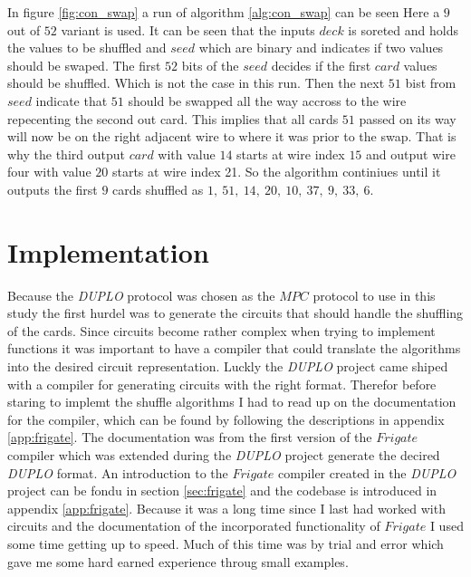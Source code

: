 \documentclass[twoside,11pt,openright]{report}
\newcommand{\DUPLO}{\textit{DUPLO} }
\begin{document}
In figure \ref{fig:con_swap} a run of algorithm \ref{alg:con_swap} can be seen Here a $9$ out of $52$ variant is used. It can be seen that the inputs $deck$ is soreted and holds the values to be shuffled and $seed$ which are binary and indicates if two values should be swaped. The first $52$ bits of the $seed$ decides if the first $card$ values should be shuffled. Which is not the case in this run. Then the next $51$ bist from $seed$ indicate that $51$ should be swapped all the way accross to the wire repecenting the second out card. This implies that all cards $51$ passed on its way will now be on the right adjacent wire to where it was prior to the swap. That is why the third output $card$ with value $14$ starts at wire index $15$ and output wire four with value $20$ starts at wire index 21. So the algorithm continiues until it outputs the first $9$ cards shuffled as $1,~51,~14,~20,~10,~37,~9,~33,~6$.


\section{Implementation}
\label{sec:cir_imp}
Because the \DUPLO protocol was chosen as the $MPC$ protocol to use in this study the first hurdel was to generate the circuits that should handle the shuffling of the cards. Since circuits become rather complex when trying to implement functions it was important to have a compiler that could translate the algorithms into the desired circuit representation. Luckly the \DUPLO project came shiped with a compiler for generating circuits with the right format. Therefor before staring to implemt the shuffle algorithms I had to read up on the documentation for the compiler, which can be found by following the descriptions in appendix \ref{app:frigate}. The documentation was from the first version of the $Frigate$ compiler which was extended during the \DUPLO project generate the decired \DUPLO format. An introduction to the $Frigate$ compiler created in the \DUPLO project can be fondu in section \ref{sec:frigate} and the codebase is introduced in appendix \ref{app:frigate}. Because it was a long time since I last had worked with circuits and the documentation of the incorporated functionality of $Frigate$ I used some time getting up to speed. Much of this time was by trial and error which gave me some hard earned experience throug small examples.

\bigskip
\end{document}
